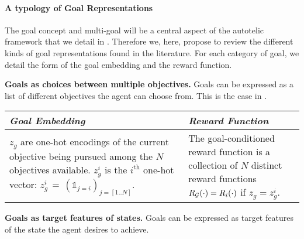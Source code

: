 \paragraph{A typology of Goal Representations}

The goal concept and multi-goal \rl will be a central aspect of the autotelic \rl framework that we detail in . Therefore we, here, propose to review the different kinds of goal representations found in the literature. For each category of goal, we detail the form of the goal embedding and the reward function.

\noindent \textbf{Goals as choices between multiple objectives. } Goals can be expressed as a list of different objectives the agent can choose from. This is the case in \citet{oh2017zero,mankowitz2018unicorn,codevilla2018end,chan_actrce_2019}.
\begin{table}[!h]
    \centering
    \small
    \begin{tabularx}{.85\linewidth}{X|X}
    \textit{Goal Embedding}  &    \textit{Reward Function}  \\
    \hline
     $z_g$ are one-hot encodings of the current objective being pursued among the $N$ objectives available. $z_g^i$ is the $i^\text{th}$ one-hot vector: $z_g^i\,=\,(\mathds{1}_{j=i})_{j=[1..N]}$. 
        & The goal-conditioned reward function is a collection of $N$ distinct reward functions $R_{\mathcal{G}}(\cdot)=R_i(\cdot)$ if $z_g=z_g^i$. 
    \end{tabularx}
\end{table}

\noindent \textbf{Goals as target features of states. } Goals can be expressed as target features of the state the agent desires to achieve.

